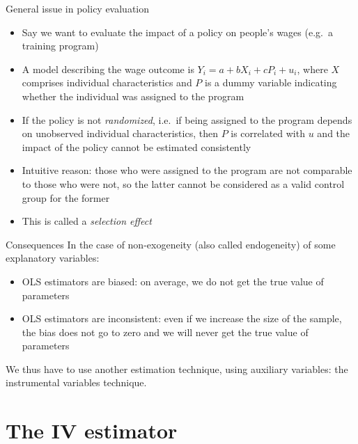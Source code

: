 \documentclass[aspectratio=169]{beamer}
\begin{document}
\begin{frame}{General issue in policy evaluation}
\begin{itemize}
    \item Say we want to evaluate the impact of a policy on people's wages (e.g.\ a training program)
    \item A model describing the wage outcome is $Y_i = a + bX_i + cP_i + u_i$, where $X$ comprises individual characteristics and $P$ is a dummy variable indicating whether the individual was assigned to the program
    \item If the policy is not \emph{randomized}, i.e.\ if being assigned to the program depends on unobserved individual characteristics, then $P$ is correlated with $u$ and the impact of the policy cannot be estimated consistently
    \item Intuitive reason: those who were assigned to the program are not comparable to those who were not, so the latter cannot be considered as a valid control group for the former
    \item This is called a \emph{selection effect}
\end{itemize}
\end{frame}

\begin{frame}{Consequences}
In the case of non-exogeneity (also called endogeneity) of some explanatory variables:
\begin{itemize}
    \item OLS estimators are biased: on average, we do not get the true value of parameters
    \item OLS estimators are inconsistent: even if we increase the size of the sample, the bias does not go to zero and we will never get the true value of parameters
\end{itemize}

We thus have to use another estimation technique, using auxiliary variables: the instrumental variables technique.
\end{frame}

\section{The IV estimator}
\end{document}
